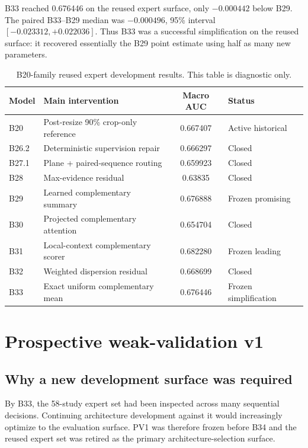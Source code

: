 \documentclass[preprint,12pt]{elsarticle}
\begin{document}
B33 reached 0.676446 on the reused expert surface, only $-0.000442$ below B29. The paired B33--B29 median was $-0.000496$, 95\% interval $[-0.023312,+0.022036]$. Thus B33 was a successful simplification on the reused surface: it recovered essentially the B29 point estimate using half as many new parameters.

\begin{table}[ht]
\centering
\caption{B20-family reused expert development results. This table is diagnostic only.}
\label{tab:b20family}
\begin{tabular}{llcl}
\toprule
Model & Main intervention & Macro AUC & Status \\
\midrule
B20 & Post-resize 90\% crop-only reference & 0.667407 & Active historical \\
B26.2 & Deterministic supervision repair & 0.666297 & Closed \\
B27.1 & Plane + paired-sequence routing & 0.659923 & Closed \\
B28 & Max-evidence residual & 0.63835 & Closed \\
B29 & Learned complementary summary & 0.676888 & Frozen promising \\
B30 & Projected complementary attention & 0.654704 & Closed \\
B31 & Local-context complementary scorer & 0.682280 & Frozen leading \\
B32 & Weighted dispersion residual & 0.668699 & Closed \\
B33 & Exact uniform complementary mean & 0.676446 & Frozen simplification \\
\bottomrule
\end{tabular}
\end{table}

\section{Prospective weak-validation v1}
\label{sec:pv1}

\subsection{Why a new development surface was required}
By B33, the 58-study expert set had been inspected across many sequential decisions. Continuing architecture development against it would increasingly optimize to the evaluation surface. PV1 was therefore frozen before B34 and the reused expert set was retired as the primary architecture-selection surface.
\end{document}
